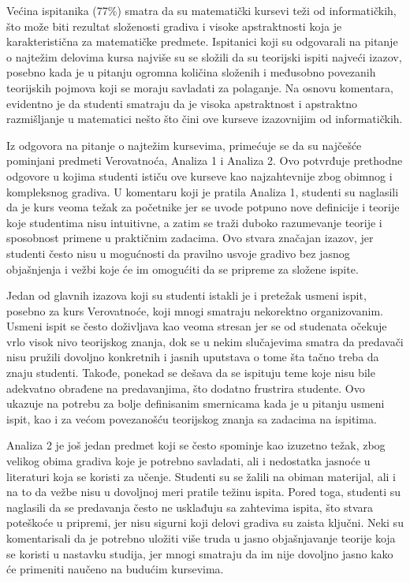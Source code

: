 \documentclass[a4paper]{article}
\begin{document}
Većina ispitanika (77\%) smatra da su matematički kursevi teži od informatičkih, što može biti rezultat složenosti gradiva i visoke apstraktnosti koja je karakteristična za matematičke predmete. Ispitanici koji su odgovarali na pitanje o najtežim delovima kursa najviše su se složili da su teorijski ispiti najveći izazov, posebno kada je u pitanju ogromna količina složenih i međusobno povezanih teorijskih pojmova koji se moraju savladati za polaganje. Na osnovu komentara, evidentno je da studenti smatraju da je visoka apstraktnost i apstraktno razmišljanje u matematici nešto što čini ove kurseve izazovnijim od informatičkih.

Iz odgovora na pitanje o najtežim kursevima, primećuje se da su najčešće pominjani predmeti Verovatnoća, Analiza 1 i Analiza 2. Ovo potvrđuje prethodne odgovore u kojima studenti ističu ove kurseve kao najzahtevnije zbog obimnog i kompleksnog gradiva. U komentaru koji je pratila Analiza 1, studenti su naglasili da je kurs veoma težak za početnike jer se uvode potpuno nove definicije i teorije koje studentima nisu intuitivne, a zatim se traži duboko razumevanje teorije i sposobnost primene u praktičnim zadacima. Ovo stvara značajan izazov, jer studenti često nisu u mogućnosti da pravilno usvoje gradivo bez jasnog objašnjenja i vežbi koje će im omogućiti da se pripreme za složene ispite.

Jedan od glavnih izazova koji su studenti istakli je i pretežak usmeni ispit, posebno za kurs Verovatnoće, koji mnogi smatraju nekorektno organizovanim. Usmeni ispit se često doživljava kao veoma stresan jer se od studenata očekuje vrlo visok nivo teorijskog znanja, dok se u nekim slučajevima smatra da predavači nisu pružili dovoljno konkretnih i jasnih uputstava o tome šta tačno treba da znaju studenti. Takođe, ponekad se dešava da se ispituju teme koje nisu bile adekvatno obrađene na predavanjima, što dodatno frustrira studente. Ovo ukazuje na potrebu za bolje definisanim smernicama kada je u pitanju usmeni ispit, kao i za većom povezanošću teorijskog znanja sa zadacima na ispitima.

Analiza 2 je još jedan predmet koji se često spominje kao izuzetno težak, zbog velikog obima gradiva koje je potrebno savladati, ali i nedostatka jasnoće u literaturi koja se koristi za učenje. Studenti su se žalili na obiman materijal, ali i na to da vežbe nisu u dovoljnoj meri pratile težinu ispita. Pored toga, studenti su naglasili da se predavanja često ne usklađuju sa zahtevima ispita, što stvara poteškoće u pripremi, jer nisu sigurni koji delovi gradiva su zaista ključni. Neki su komentarisali da je potrebno uložiti više truda u jasno objašnjavanje teorije koja se koristi u nastavku studija, jer mnogi smatraju da im nije dovoljno jasno kako će primeniti naučeno na budućim kursevima.
\end{document}
